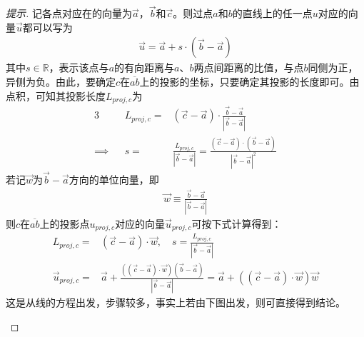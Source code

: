 \begin{proof}[提示]
  记各点对应在的向量为$\vec a$，$\vec b$和$\vec c$。则过点$a$和$b$的直线上的任一点$u$对应的向量$\vec u$都可以写为
  \begin{align*}
    \vec u=\vec a + s\cdot(\vec b-\vec a)
  \end{align*}
  其中$s\in\mathbb{R}$，表示该点与$a$的有向距离与$a$、$b$两点间距离的比值，与点$b$同侧为正，异侧为负。由此，要确定$c$在$\overline{ab}$上的投影的坐标，只要确定其投影的长度即可。由点积，可知其投影长度$L_{proj,c}$为
  \begin{alignat*}{3}
    &&L_{proj,c} ={}& (\vec c-\vec a)\cdot \frac{\vec b - \vec a}{\left| \vec b - \vec a \right|}\\
    \implies&& s ={}& \frac{L_{proj,c}}{\left| \vec b - \vec a \right|} =
    \frac{(\vec c-\vec a)\cdot(\vec b - \vec a)}{\left| \vec b - \vec a \right|^2}
  \end{alignat*}
  若记$\vec w$为$\vec b-\vec a$方向的单位向量，即
  \begin{align*}
    \vec w\equiv \frac{\vec b - \vec a}{\left| \vec b - \vec a \right|}
  \end{align*}
  则$c$在$\overline{ab}$上的投影点$u_{proj,c}$对应的向量$\vec u_{proj,c}$可按下式计算得到：
  \begin{align*}
    L_{proj,c} ={}& (\vec c-\vec a)\cdot \vec w, \quad
             s ={} \frac{L_{proj,c}}{\left| \vec b - \vec a \right|}\\
    \vec u_{proj,c}={}& \vec a + \frac{((\vec c-\vec a)\cdot\vec w)(\vec b-\vec a)}{\left| \vec b - \vec a \right|}
                        =\vec a + ((\vec c-\vec a)\cdot\vec w)\vec w
  \end{align*}
  这是从线的方程出发，步骤较多，事实上若由下图出发，则可直接得到结论。
  \begin{center}
\end{center}
\end{proof}
